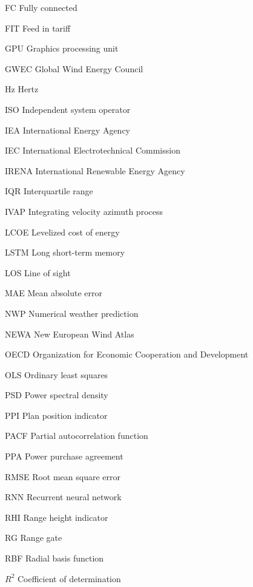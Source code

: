 \begin{abbreviations}
\item[FC] Fully connected 
\item[FIT] Feed in tariff 

\item[GPU] Graphics processing unit
\item[GWEC] Global Wind Energy Council

\item[Hz] Hertz

\item[ISO] Independent system operator
\item[IEA] International Energy Agency
\item[IEC] International Electrotechnical Commission
\item[IRENA] International Renewable Energy Agency
\item[IQR] Interquartile range
\item[IVAP] Integrating velocity azimuth process

\item[LCOE] Levelized cost of energy
\item[LSTM] Long short-term memory
\item[LOS] Line of sight

\item[MAE] Mean absolute error

\item[NWP] Numerical weather prediction
\item[NEWA] New European Wind Atlas

\item[OECD] Organization for Economic Cooperation and Development
\item[OLS] Ordinary least squares 

\item[PSD] Power spectral density
\item[PPI] Plan position indicator
\item[PACF] Partial autocorrelation function
\item[PPA] Power purchase agreement

\item[RMSE] Root mean square error
\item[RNN] Recurrent neural network
\item[RHI] Range height indicator
\item[RG] Range gate
\item[RBF] Radial basis function
\item[$R^2$] Coefficient of determination


\end{abbreviations}
